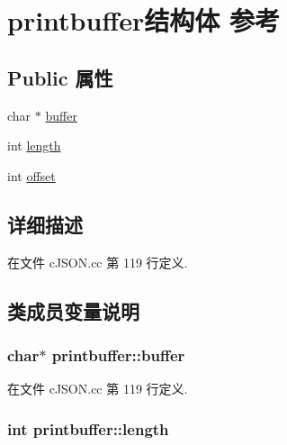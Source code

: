 \hypertarget{structprintbuffer}{}\section{printbuffer结构体 参考}
\label{structprintbuffer}
\subsection*{Public 属性}
\begin{DoxyCompactItemize}
\item 
char $\ast$ \hyperlink{structprintbuffer_a5176d97bde8869f161c877e52767b350}{buffer}
\item 
int \hyperlink{structprintbuffer_ae0320ae6fa335d537ce2ad2e09dabf61}{length}
\item 
int \hyperlink{structprintbuffer_ac1e12f39d1f481112ccdb004235f7760}{offset}
\end{DoxyCompactItemize}


\subsection{详细描述}


在文件 c\+J\+S\+O\+N.\+cc 第 119 行定义.



\subsection{类成员变量说明}
\hypertarget{structprintbuffer_a5176d97bde8869f161c877e52767b350}{}
\subsubsection[{buffer}]{\setlength{\rightskip}{0pt plus 5cm}char$\ast$ printbuffer\+::buffer}\label{structprintbuffer_a5176d97bde8869f161c877e52767b350}


在文件 c\+J\+S\+O\+N.\+cc 第 119 行定义.

\hypertarget{structprintbuffer_ae0320ae6fa335d537ce2ad2e09dabf61}{}
\subsubsection[{length}]{\setlength{\rightskip}{0pt plus 5cm}int printbuffer\+::length}\label{structprintbuffer_ae0320ae6fa335d537ce2ad2e09dabf61}


